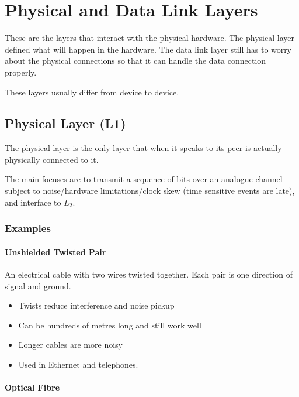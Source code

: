 \section{Physical and Data Link Layers}\label{sec:physical_and_data_link_layers}

These are the layers that interact with the physical hardware.
The physical layer defined what will happen in the hardware.
The data link layer still has to worry about the physical connections so that it can handle the data connection properly.

\begin{note}
	These layers usually differ from device to device.
\end{note}

\subsection{Physical Layer (L1)}\label{sub:physical_layer_or_mkl1_}

The physical layer is the only layer that when it speaks to its peer is actually physically connected to it.

The main focuses are to transmit a sequence of bits over an analogue channel subject to noise/hardware limitations/clock skew (time sensitive events are late), and interface to \(L_2\).

\subsubsection{Examples}\label{ssub:examples_}

\paragraph{Unshielded Twisted Pair}\label{par:unshielded_twisted_pair}

An electrical cable with two wires twisted together.
Each pair is one direction of signal and ground.
\begin{itemize}
	\item Twists reduce interference and noise pickup
	\item Can be hundreds of metres long and still work well
	\item Longer cables are more noisy
	\item Used in Ethernet and telephones.
\end{itemize}

\paragraph{Optical Fibre}\label{par:optical_fibre}


